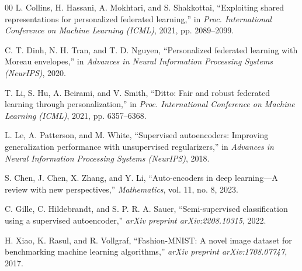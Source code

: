 \documentclass[conference]{IEEEtran}
\begin{document}
\begin{thebibliography}{00}
L. Collins, H. Hassani, A. Mokhtari, and S. Shakkottai, ``Exploiting shared representations for personalized federated learning,'' in \emph{Proc. International Conference on Machine Learning (ICML)}, 2021, pp. 2089--2099.

C. T. Dinh, N. H. Tran, and T. D. Nguyen, ``Personalized federated learning with Moreau envelopes,'' in \emph{Advances in Neural Information Processing Systems (NeurIPS)}, 2020.

T. Li, S. Hu, A. Beirami, and V. Smith, ``Ditto: Fair and robust federated learning through personalization,'' in \emph{Proc. International Conference on Machine Learning (ICML)}, 2021, pp. 6357--6368.

L. Le, A. Patterson, and M. White, ``Supervised autoencoders: Improving generalization performance with unsupervised regularizers,'' in \emph{Advances in Neural Information Processing Systems (NeurIPS)}, 2018.

S. Chen, J. Chen, X. Zhang, and Y. Li, ``Auto-encoders in deep learning---A review with new perspectives,'' \emph{Mathematics}, vol. 11, no. 8, 2023.

C. Gille, C. Hildebrandt, and S. P. R. A. Sauer, ``Semi-supervised classification using a supervised autoencoder,'' \emph{arXiv preprint arXiv:2208.10315}, 2022.

H. Xiao, K. Rasul, and R. Vollgraf, ``Fashion-MNIST: A novel image dataset for benchmarking machine learning algorithms,'' \emph{arXiv preprint arXiv:1708.07747}, 2017.

\end{thebibliography}



\balance
\end{document}
